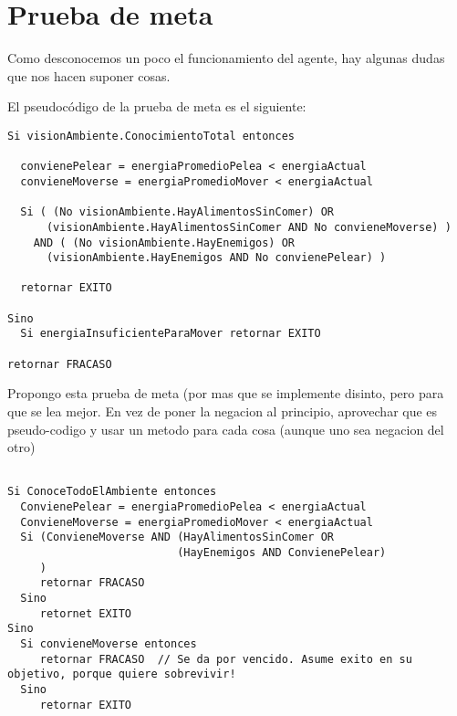 \section{Prueba de meta}

Como desconocemos un poco el funcionamiento del agente, hay algunas dudas que
nos hacen suponer cosas.

El pseudocódigo de la prueba de meta es el siguiente:

\begin{verbatim}
Si visionAmbiente.ConocimientoTotal entonces

  convienePelear = energiaPromedioPelea < energiaActual
  convieneMoverse = energiaPromedioMover < energiaActual

  Si ( (No visionAmbiente.HayAlimentosSinComer) OR
      (visionAmbiente.HayAlimentosSinComer AND No convieneMoverse) )
    AND ( (No visionAmbiente.HayEnemigos) OR
      (visionAmbiente.HayEnemigos AND No convienePelear) )

  retornar EXITO

Sino
  Si energiaInsuficienteParaMover retornar EXITO

retornar FRACASO
\end{verbatim}

Propongo esta prueba de meta (por mas que se implemente disinto, pero para que se lea mejor. En vez de poner la negacion al principio, aprovechar que es pseudo-codigo y usar un metodo para cada cosa (aunque uno sea negacion del otro)
\begin{verbatim}

Si ConoceTodoElAmbiente entonces
  ConvienePelear = energiaPromedioPelea < energiaActual
  ConvieneMoverse = energiaPromedioMover < energiaActual
  Si (ConvieneMoverse AND (HayAlimentosSinComer OR 
                          (HayEnemigos AND ConvienePelear) 
     )  
     retornar FRACASO
  Sino
     retornet EXITO
Sino
  Si convieneMoverse entonces
     retornar FRACASO  // Se da por vencido. Asume exito en su objetivo, porque quiere sobrevivir!
  Sino
     retornar EXITO

\end{verbatim}

